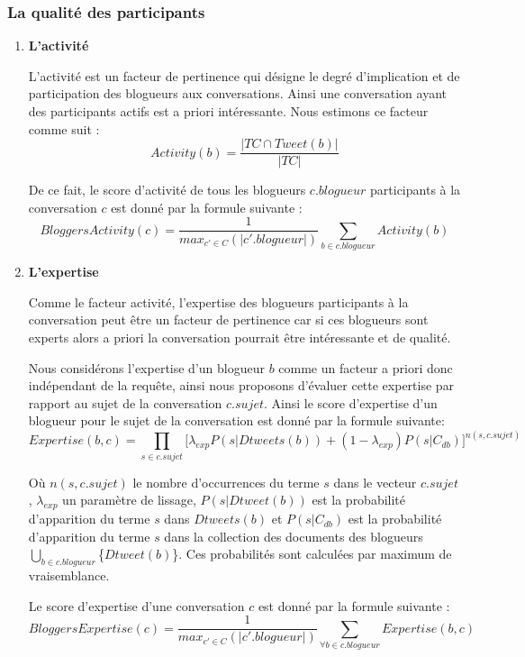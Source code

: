 \documentclass{article-hermes}
\begin{document}
\subsubsection{La qualité des participants}
\begin{enumerate}
\item  \textbf{L'activité} 
\par L'activité est un facteur de pertinence qui désigne le degré d'implication et de participation des blogueurs aux conversations. Ainsi une conversation ayant des participants actifs est a priori intéressante. Nous estimons ce facteur comme suit :
\begin{equation}
Activity(b) = \frac{|TC \cap Tweet(b)|}{|TC|}
\end{equation} 
\par De ce fait, le score d'activité de tous les blogueurs $c.blogueur$ participants à la conversation $c$ est donné par la formule suivante :
\begin{equation}
BloggersActivity(c)  = \frac{1}{max_{c'\in C} ( |c'.blogueur|)}  \sum_{b \in c.blogueur} Activity(b)
\end{equation}

\item  \textbf{L'expertise} 
\par Comme le facteur activité, l'expertise  des blogueurs participants à la conversation peut être un facteur de pertinence car si ces blogueurs sont experts alors a priori la conversation pourrait être intéressante et de qualité. 
\par Nous considérons l'expertise d'un blogueur $b$ comme un facteur a priori donc indépendant de la requête, ainsi nous proposons d'évaluer cette expertise par rapport au sujet de la conversation $c.sujet$. Ainsi le score d'expertise d'un blogueur pour le sujet de la conversation est donné par la formule suivante:  
\begin{equation}
Expertise(b,c) = \prod_{s\in c.sujet} \Big [ \lambda_{exp} P(s|Dtweets(b)) + (1-\lambda_{exp})P(s|C_{db}) \Big ] ^{n(s,c.sujet)}
\end{equation}
\par Où $n(s,c.sujet)$ le nombre d'occurrences du terme $s$ dans le vecteur $c.sujet$, $\lambda_{exp}$ un paramètre de lissage, $P(s|Dtweet(b))$ est la probabilité d'apparition du terme $s$ dans $Dtweets(b)$ et $P(s|C_{db})$ est la probabilité d'apparition du terme $s$ dans la collection des documents des blogueurs $\bigcup_{b \in c.blogueur} $\{$Dtweet(b)$\}. Ces probabilités sont calculées par maximum de vraisemblance.
\par Le score d'expertise d'une conversation $c$ est donné par la formule suivante :
\begin{equation}
BloggersExpertise(c)  = \frac{1}{max_{c'\in C} ( |c'.blogueur|)}  \sum_{\forall{b \in c.blogueur}} Expertise(b,c)
\end{equation}


\end{enumerate}
\end{document}
